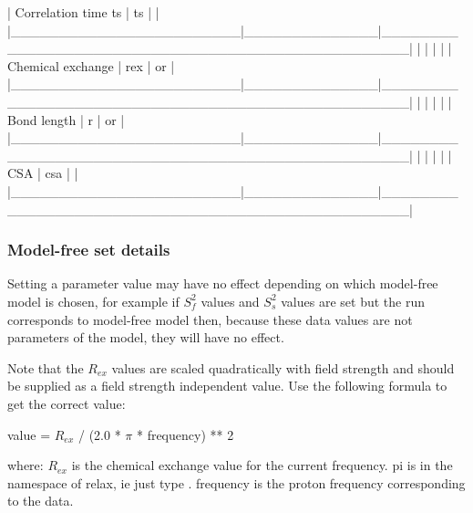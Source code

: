 | Correlation time ts    | ts           | 
                                           |
|\_\_\_\_\_\_\_\_\_\_\_\_\_\_\_\_\_\_\_\_\_\_\_\_|\_\_\_\_\_\_\_\_\_\_\_\_\_\_|\_\_\_\_\_\_\_\_\_\_\_\_\_\_\_\_\_\_\_\_\_\_\_\_\_\_\_\_\_\_\_\_\_\_\_\_\_\_\_\_\_\_\_\_\_\_\_\_\_\_|
|                        |              |                                                  |
| Chemical exchange      | rex          | 
 or 
       |
|\_\_\_\_\_\_\_\_\_\_\_\_\_\_\_\_\_\_\_\_\_\_\_\_|\_\_\_\_\_\_\_\_\_\_\_\_\_\_|\_\_\_\_\_\_\_\_\_\_\_\_\_\_\_\_\_\_\_\_\_\_\_\_\_\_\_\_\_\_\_\_\_\_\_\_\_\_\_\_\_\_\_\_\_\_\_\_\_\_|
|                        |              |                                                  |
| Bond length            | r            | 
 or 
                 |
|\_\_\_\_\_\_\_\_\_\_\_\_\_\_\_\_\_\_\_\_\_\_\_\_|\_\_\_\_\_\_\_\_\_\_\_\_\_\_|\_\_\_\_\_\_\_\_\_\_\_\_\_\_\_\_\_\_\_\_\_\_\_\_\_\_\_\_\_\_\_\_\_\_\_\_\_\_\_\_\_\_\_\_\_\_\_\_\_\_|
|                        |              |                                                  |
| CSA                    | csa          | 
                                 |
|\_\_\_\_\_\_\_\_\_\_\_\_\_\_\_\_\_\_\_\_\_\_\_\_|\_\_\_\_\_\_\_\_\_\_\_\_\_\_|\_\_\_\_\_\_\_\_\_\_\_\_\_\_\_\_\_\_\_\_\_\_\_\_\_\_\_\_\_\_\_\_\_\_\_\_\_\_\_\_\_\_\_\_\_\_\_\_\_\_|



\subsubsection{Model-free set details}

Setting a parameter value may have no effect depending on which model-free model is chosen,
for example if $S^2_f$ values and $S^2_s$ values are set but the run corresponds to model-free model
 then, because these data values are not parameters of the model, they will have no
effect.

Note that the $R_{ex}$ values are scaled quadratically with field strength and should be supplied
as a field strength independent value.  Use the following formula to get the correct value:

    value = $R_{ex}$ / (2.0 * $\pi$ * frequency) ** 2

where:
    $R_{ex}$ is the chemical exchange value for the current frequency.
    pi is in the namespace of relax, ie just type 
.
    frequency is the proton frequency corresponding to the data.



